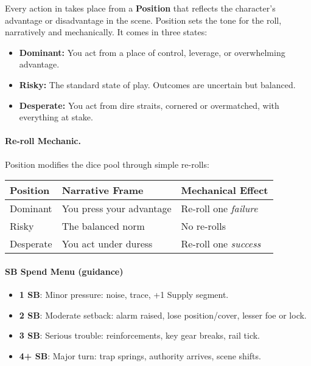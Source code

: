 Every action in  takes place from a \textbf{Position} that reflects the character’s advantage or disadvantage in the scene. Position sets the tone for the roll, narratively and mechanically. It comes in three states:

\begin{itemize}
  \item \textbf{Dominant:} You act from a place of control, leverage, or overwhelming advantage.
  \item \textbf{Risky:} The standard state of play. Outcomes are uncertain but balanced.
  \item \textbf{Desperate:} You act from dire straits, cornered or overmatched, with everything at stake.
\end{itemize}

\paragraph{Re-roll Mechanic.}  
Position modifies the dice pool through simple re-rolls:
\begin{center}
\begin{tabular}{@{}lll@{}}
\toprule
\textbf{Position} & \textbf{Narrative Frame} & \textbf{Mechanical Effect} \\
\midrule
Dominant & You press your advantage & Re-roll one \emph{failure} \\
Risky    & The balanced norm & No re-rolls \\
Desperate & You act under duress & Re-roll one \emph{success} \\
\bottomrule
\end{tabular}
\end{center}

\paragraph{SB Spend Menu (guidance)}
\begin{itemize}
  \item \textbf{1 SB}: Minor pressure: noise, trace, +1 Supply segment.
  \item \textbf{2 SB}: Moderate setback: alarm raised, lose position/cover, lesser foe or lock.
  \item \textbf{3 SB}: Serious trouble: reinforcements, key gear breaks, rail tick.
  \item \textbf{4+ SB}: Major turn: trap springs, authority arrives, scene shifts.
\end{itemize}

